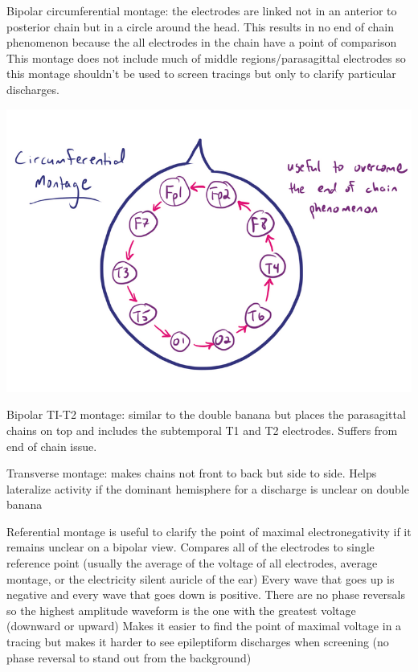 \documentclass[12pt]{article}
\begin{document}
Bipolar circumferential montage: the electrodes are linked not in an anterior to posterior chain but in a circle around the head. This results in no end of chain phenomenon because the all electrodes in the chain have a point of comparison 
This montage does not include much of middle regions/parasagittal electrodes so this montage shouldn’t be used to screen tracings but only to clarify particular discharges.

\includegraphics[scale=0.4]{CircumferentialMontage}

Bipolar TI-T2 montage: similar to the double banana but places the parasagittal chains on top and includes the subtemporal T1 and T2 electrodes. Suffers from end of chain issue.


Transverse montage: makes chains not front to back but side to side. Helps lateralize activity if the dominant hemisphere for a discharge is unclear on double banana


Referential montage is useful to clarify the point of maximal electronegativity if it remains unclear on a bipolar view.
Compares all of the electrodes to single reference point (usually the average of the voltage of all electrodes, average montage, or the electricity silent auricle of the ear)
Every wave that goes up is negative and every wave that goes down is positive. 
There are no phase reversals so the highest amplitude waveform is the one with the greatest voltage (downward or upward)
Makes it easier to find the point of maximal voltage in a tracing but makes it harder to see epileptiform discharges when screening (no phase reversal to stand out from the background)
\end{document}
